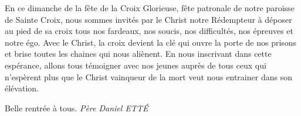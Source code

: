 En ce dimanche de la fête de la Croix Glorieuse, fête patronale de notre paroisse de Sainte Croix, nous sommes invités par le Christ notre Rédempteur à déposer au pied de sa croix tous nos fardeaux, nos soucis, nos difficultés, nos épreuves et notre égo. Avec le Christ, la croix devient la clé qui ouvre la porte de nos prisons et brise toutes les chaines qui nous aliènent. En nous inscrivant dans cette espérance, allons tous témoigner avec nos jeunes auprès de tous ceux qui n’espèrent plus que le Christ vainqueur de la mort veut nous entrainer dans son élévation.



\begin{flushright}
Belle rentrée à tous.
\textit{Père  Daniel  ETTÉ}
\end{flushright}

